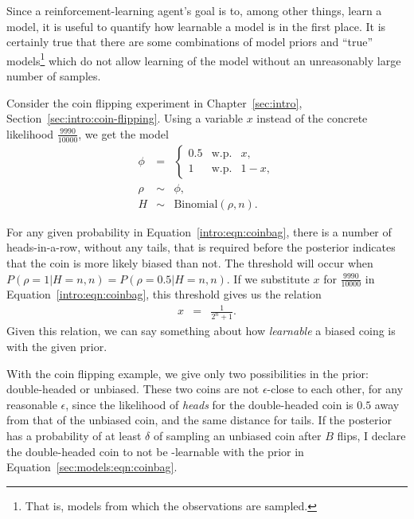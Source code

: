 
Since a reinforcement-learning agent's goal is to, among other things, learn a model, it is useful to quantify how learnable a model is in the first place. It is certainly true that there are some combinations of model priors and ``true'' models\footnote{That is, models from which the observations are sampled.} which do not allow learning of the model without an unreasonably large number of samples.

Consider the coin flipping experiment in Chapter~\ref{sec:intro}, Section~\ref{sec:intro:coin-flipping}. Using a variable $x$ instead of the concrete likelihood $\frac{9990}{10000}$, we get the model
\begin{eqnarray}
\label{sec:models:eqn:coinbag}
\phi &=& \left\{\begin{array}{lll}
0.5 & \mbox{w.p.} & x,\\
1 & \mbox{w.p.} & 1-x,
\end{array}\right.\\
\rho &\sim&\phi,\\
H &\sim& \mbox{Binomial}(\rho, n).
\end{eqnarray}

For any given probability in Equation~\ref{intro:eqn:coinbag}, there is a number of heads-in-a-row, without any tails, that is required before the posterior indicates that the coin is more likely biased than not. The threshold will occur when $P(\rho=1|H=n,n)=P(\rho=0.5|H=n,n)$. If we substitute $x$ for $\frac{9990}{10000}$ in Equation~\ref{intro:eqn:coinbag}, this threshold gives us the relation
\begin{eqnarray}
x &=& \frac{1}{2^n+1}.
\end{eqnarray}
Given this relation, we can say something about how \emph{learnable} a biased coing is with the given prior.


With the coin flipping example, we give only two possibilities in the prior: double-headed or unbiased. These two coins are not $\epsilon$-close to each other, for any reasonable $\epsilon$, since the likelihood of \emph{heads} for the double-headed coin is $0.5$ away from that of the unbiased coin, and the same distance for tails. If the posterior has a probability of at least $\delta$ of sampling an unbiased coin after $B$ flips, I declare the double-headed coin to not be \bed-learnable with the prior in Equation~\ref{sec:models:eqn:coinbag}.

